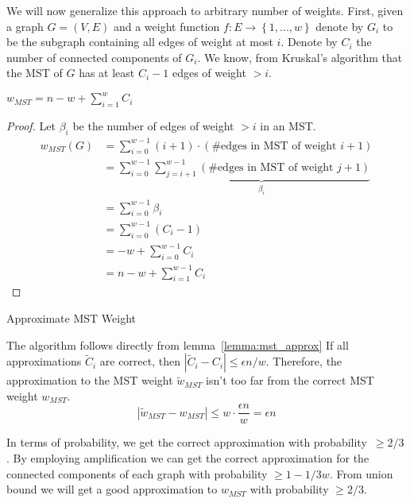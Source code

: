 We will now generalize this approach to arbitrary number of weights.
First, given a graph $G=(V,E)$ and a weight function $f:E \rightarrow \left\{1,...,w\right\}$ denote by $G_i$ to be the subgraph containing all edges of weight at most $i$. 
Denote by $C_i$ the number of connected components of $G_i$.
We know, from Kruskal's algorithm that the MST of $G$ has at least $C_i -1$ edges of weight $>i$.

\begin{lemma}\label{lemma:mst_approx}
$w_{MST}=n-w+\sum_{i=1}^{w}C_i$
\end{lemma}

\begin{proof}
Let $\beta_i$ be the number of edges of weight $>i$ in an MST.
\[
    \begin{aligned}
w_{MST}(G) &= \sum_{i=0}^{w-1}(i+1)\cdot(\text{\#edges in MST of weight } i+1) \\
&= \sum_{i=0}^{w-1}\underbrace{\sum_{j=i+1}^{w-1}(\text{\#edges in MST of weight } j+1)}_{\beta_i} \\
&= \sum_{i=0}^{w-1}\beta_i \\
&= \sum_{i=0}^{w-1}(C_i-1) \\
&= -w + \sum_{i=0}^{w-1}C_i \\
&= n - w + \sum_{i=1}^{w-1}C_i
\end{aligned}
\]
\end{proof}

\begin{algorithm}[t]

\caption{Approximate MST Weight}
\end{algorithm}

The algorithm follows directly from lemma~\ref{lemma:mst_approx}
If all approximations $\tilde{C}_i$ are correct, then \(\left|\tilde{C}_i - C_i \right| \leq \epsilon n / w\).
Therefore, the approximation to the MST weight $\tilde{w}_{MST}$ isn't too far from the correct MST weight $w_{MST}$.
\[
\left| \tilde{w}_{MST} - w_{MST} \right| \leq w \cdot \frac{\epsilon n}{w} = \epsilon n
\]

In terms of probability, we get the correct approximation with probability~$\geq 2/3$.
By employing amplification we can get the correct approximation for the connected components of each graph with probability $\geq 1 - 1/3w$.
From union bound we will get a good approximation to $w_{MST}$ with probability $\geq 2/3$.

